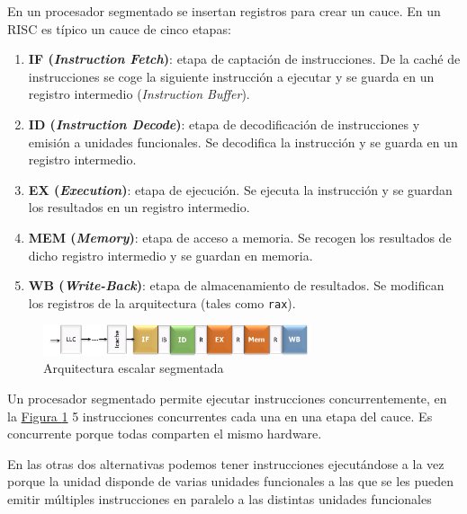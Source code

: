 \documentclass[10pt,a4paper,spanish]{report}
\begin{document}
En un procesador segmentado se insertan registros para crear un cauce. En un RISC es típico un cauce de cinco etapas:
\begin{enumerate}[\color{azul}{\bf $\heartsuit$}]
    \item \textbf{\textcolor[rgb]{0.2,0.4,0.8}{IF (\textit{Instruction Fetch})}}: etapa de captación de instrucciones. De la caché de instrucciones se coge la siguiente instrucción a ejecutar y se guarda en un registro intermedio (\textit{\textcolor[rgb]{0.2,0.4,0.8}{Instruction Buffer}}).
    \item \textbf{\textcolor[rgb]{0.2,0.4,0.8}{ID (\textit{Instruction Decode})}}: etapa de decodificación de instrucciones y emisión a unidades funcionales. Se decodifica la instrucción y se guarda en un registro intermedio.
    \item \textcolor[rgb]{0.2,0.4,0.8}{\textbf{EX (\textit{Execution})}}: etapa de ejecución. Se ejecuta la instrucción y se guardan los resultados en un registro intermedio.
    \item \textcolor[rgb]{0.2,0.4,0.8}{\textbf{MEM (\textit{Memory})}}: etapa de acceso a memoria. Se recogen los resultados de dicho registro intermedio y se guardan en memoria.
    \item \textcolor[rgb]{0.2,0.4,0.8}{\textbf{WB (\textit{Write-Back})}}: etapa de almacenamiento de resultados. Se modifican los registros de la arquitectura (tales como \verb*|rax|).
\end{enumerate}

\begin{figure}[!h]
\centering
\includegraphics[width=0.7\textwidth]{59}
\caption{Arquitectura escalar segmentada}
\label{arq_es}
\end{figure}

Un procesador segmentado permite ejecutar instrucciones concurrentemente, en la \hyperref[arq_es]{Figura \ref*{arq_es}} 5 instrucciones concurrentes cada una en una etapa del cauce. Es concurrente porque todas comparten el mismo hardware.


En las otras dos alternativas podemos tener instrucciones ejecutándose a la vez porque la unidad disponde de varias unidades funcionales a las que se les pueden emitir múltiples instrucciones en paralelo a las distintas unidades funcionales
\end{document}
